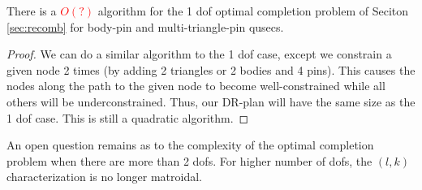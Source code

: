 \begin{theorem}
    There is a \textcolor{red}{$O(?)$} algorithm for the 1 dof optimal completion problem of Seciton \ref{sec:recomb} for body-pin and multi-triangle-pin qusecs.
\end{theorem}

\begin{proof}
    We can do a similar algorithm to the 1 dof case, except we constrain a given node 2 times (by adding 2 triangles or 2 bodies and 4 pins). This causes the nodes along the path to the given node to become well-constrained while all others will be underconstrained. Thus, our DR-plan will have the same size as the 1 dof case. This is still a quadratic algorithm.


\end{proof}

An open question remains as to the complexity of the optimal completion problem when there are more than 2 dofs. For higher number of dofs, the $(l,k)$ characterization is no longer matroidal.
